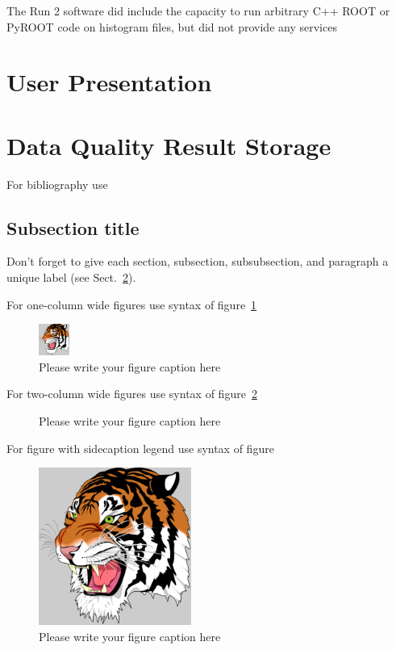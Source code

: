 \documentclass{webofc}
\begin{document}
The Run 2 software did include the capacity to run arbitrary C++ ROOT or PyROOT code on histogram files, but did not provide any services

\section{User Presentation}

\section{Data Quality Result Storage}
\label{sec-1}
For bibliography use \cite{RefJ}
\subsection{Subsection title}
\label{sec-2}
Don't forget to give each section, subsection, subsubsection, and
paragraph a unique label (see Sect.~\ref{sec-1}).

For one-column wide figures use syntax of figure~\ref{fig-1}
\begin{figure}[h]
\centering
\includegraphics[width=1cm,clip]{tiger}
\caption{Please write your figure caption here}
\label{fig-1}       %
\end{figure}

For two-column wide figures use syntax of figure~\ref{fig-2}
\begin{figure}
\centering
\vspace*{5cm}       %
\caption{Please write your figure caption here}
\label{fig-2}       %
\end{figure}

For figure with sidecaption legend use syntax of figure
\begin{figure}
\centering
\sidecaption
\includegraphics[width=5cm,clip]{tiger}
\caption{Please write your figure caption here}
\label{fig-3}       %
\end{figure}
\end{document}

